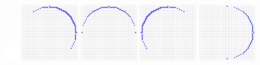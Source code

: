 \begin{figure}[th]
  \centerline{
  \includegraphics[width=0.62cm,keepaspectratio=false]{images/misc/TransparentPixel}
  \includegraphics[width=2.5cm]{images/digitalSnow/testIntegralInvariantCurvatureEstimator-PartialMask0}
  \includegraphics[width=2.5cm]{images/digitalSnow/testIntegralInvariantCurvatureEstimator-PartialMask1}
  \includegraphics[width=2.5cm]{images/digitalSnow/testIntegralInvariantCurvatureEstimator-PartialMask2}
  \includegraphics[width=2.5cm]{images/digitalSnow/testIntegralInvariantCurvatureEstimator-PartialMask3}}


\end{figure}
